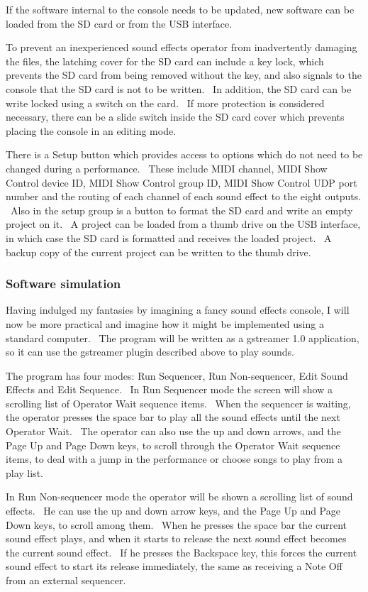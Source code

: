 \documentclass[letterpaper]{article}
\begin{document}
If the software internal to the console needs to be updated, new
software can be loaded from the SD card or from the USB interface.

To prevent an inexperienced sound effects operator from inadvertently
damaging the files, the latching cover for the SD card can include a
key lock, which prevents the SD card from being removed without the
key, and also signals to the console that the SD card is not to be
written. \ In addition, the SD card can be write locked using a switch
on the card. \ If more protection is considered necessary, there can be
a slide switch inside the SD card cover which prevents placing the
console in an editing mode.

There is a Setup button which provides access to options which do not
need to be changed during a performance. \ These include MIDI channel,
MIDI Show Control device ID, MIDI Show Control group ID, MIDI Show
Control UDP port number and the routing of each channel of each sound
effect to the eight outputs. \ Also in the setup group is a button to
format the SD card and write an empty project on it. \ A project can be
loaded from a thumb drive on the USB interface, in which case the SD
card is formatted and receives the loaded project. \ A backup copy of
the current project can be written to the thumb drive.

\subsubsection[Software simulation]{Software simulation}
Having indulged my fantasies by imagining a fancy sound effects console,
I will now be more practical and imagine how it might be implemented
using a standard computer. \ The program will be written as a gstreamer
1.0 application, so it can use the gstreamer plugin described above to
play sounds. \ 

The program has four modes: Run Sequencer, Run Non-sequencer, Edit Sound
Effects and Edit Sequence. \ In Run Sequencer mode the screen will show
a scrolling list of Operator Wait sequence items. \ When the sequencer
is waiting, the operator presses the space bar to play all the sound
effects until the next Operator Wait. \ The operator can also use the
up and down arrows, and the Page Up and Page Down keys, to scroll
through the Operator Wait sequence items, to deal with a jump in the
performance or choose songs to play from a play list.

In Run Non-sequencer mode the operator will be shown a scrolling list of
sound effects. \ He can use the up and down arrow keys, and the Page Up
and Page Down keys, to scroll among them. \ When he presses the space
bar the current sound effect plays, and when it starts to release the
next sound effect becomes the current sound effect. \ If he presses the
Backspace key, this forces the current sound effect to start its
release immediately, the same as receiving a Note Off from an external
sequencer.
\end{document}
